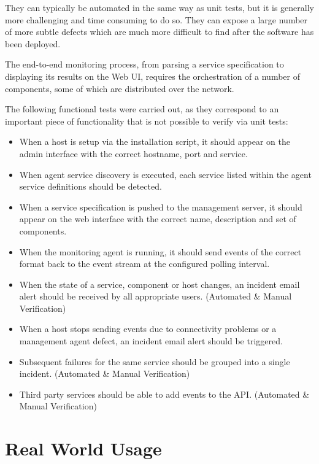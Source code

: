 \documentclass{cshonours}
\begin{document}
They can typically be automated in the same way as unit tests, but it is generally more challenging and time consuming to do so. They can expose a large number of more subtle defects which are much more difficult to find after the software has been deployed.

The end-to-end monitoring process, from parsing a service specification to displaying its results on the Web UI, requires the orchestration of a number of components, some of which are distributed over the network.

The following functional tests were carried out, as they correspond to an important piece of functionality that is not possible to verify via unit tests:

\begin{itemize}
  \item When a host is setup via the installation script, it should appear on the admin interface with the correct hostname, port and service.
  \item When agent service discovery is executed, each service listed within the agent service definitions should be detected.
  \item When a service specification is pushed to the management server, it should appear on the web interface with the correct name, description and set of components.
  \item When the monitoring agent is running, it should send events of the correct format back to the event stream at the configured polling interval.
  \item When the state of a service, component or host changes, an incident email alert should be received by all appropriate users. (Automated \& Manual Verification)
  \item When a host stops sending events due to connectivity problems or a management agent defect, an incident email alert should be triggered.
  \item Subsequent failures for the same service should be grouped into a single incident. (Automated \& Manual Verification)
  \item Third party services should be able to add events to the API. (Automated \& Manual Verification)
\end{itemize}

\section{Real World Usage}
\end{document}
